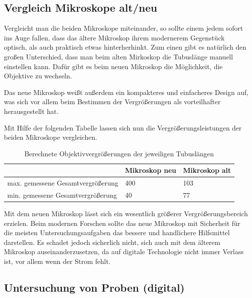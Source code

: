 \documentclass[12pt,a4paper,twoside]{article}
\begin{document}
\subsection{Vergleich Mikroskope alt/neu}

Vergleicht man die beiden Mikroskope miteinander, so sollte einem jedem sofort ins Auge fallen, dass das ältere Mikroskop ihrem modernerem Gegenstück optisch, als auch praktisch etwas hinterherhinkt.
Zum einen gibt es natürlich den großen Unterschied, dass man beim alten Mirkoskop die Tubuslänge manuell einstellen kann. Dafür gibt es beim neuen Mikroskop die Möglichkeit, die Objektive zu wechseln. \newline

\noindent
Das neue Mikroskop weißt außerdem ein kompakteres und einfacheres Design auf, was sich vor allem beim Bestimmen der Vergrößerungen als vorteilhafter herausgestellt hat. \newline

\noindent
Mit Hilfe der folgenden Tabelle lassen sich nun die Vergrößerungsleistungen der beiden Mikroskope vergleichen.

\begin{table}[H]
    \centering
    \caption{Berechnete Objektivvergrößerungen der jeweiligen Tubuslängen}
    \label{tab:Okularvergrößerungen}
    \begin{tabular}{| l | l | l |}
        \hline
           & Mikroskop neu & Mikroskop alt \\
        \hline
        max. gemessene Gesamtvergrößerung & 400 & 103 \\
        min. gemessene Gesamtvergrößerung & 40 & 77 \\
        \hline
    \end{tabular}
\end{table}

\noindent
Mit dem neuen Mikroskop lässt sich ein wesentlich größerer Vergrößerungsbereich erzielen. 
Beim modernen Forschen sollte das neue Mikroskop mit Sicherheit für die meisten Untersuchungsaufgaben das bessere und handlichere Hilfsmittel darstellen.
Es schadet jedoch sicherlich nicht, sich auch mit dem älterem Mikroskop auseinanderzusetzen, da auf digitale Technologie nicht immer Verlass ist, vor allem wenn der Strom fehlt.


\subsection{Untersuchung von Proben (digital)}
\end{document}
